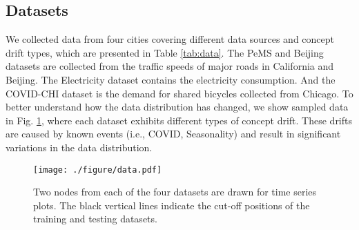 \documentclass[sigconf]{acmart}
\begin{document}
\subsection{Datasets}
We collected data from four cities covering different data sources and concept drift types, which are presented in Table \ref{tab:data}. The PeMS and Beijing datasets are collected from the traffic speeds of major roads in California and Beijing. The Electricity dataset contains the electricity consumption. And the COVID-CHI \cite{wang2022event} dataset is the demand for shared bicycles collected from Chicago. To better understand how the data distribution has changed, we show sampled data in Fig. \ref{fig:data}, where each dataset exhibits different types of concept drift. These drifts are caused by known events (i.e., COVID, Seasonality) and result in significant variations in the data distribution.
\begin{figure}[h]
	\centering
	\texttt{[image: ./figure/data.pdf]}
	\caption{Two nodes from each of the four datasets are drawn for time series plots. The black vertical lines indicate the cut-off positions of the training and testing datasets.}
	\label{fig:data}
\end{figure}
\end{document}
